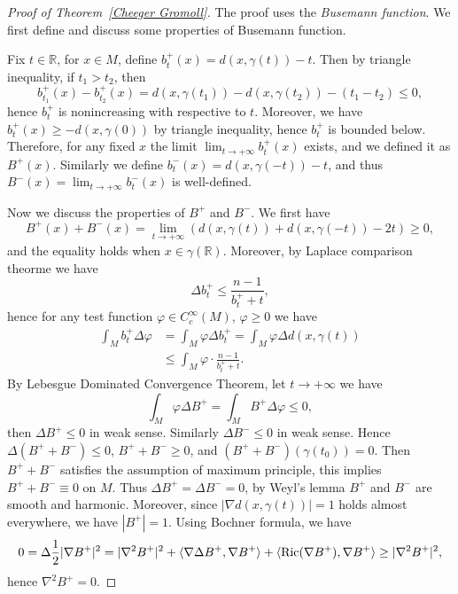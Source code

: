 \begin{proof}[Proof of Theorem~\ref{Cheeger Gromoll}]
    The proof uses the \emph{Busemann function}.
    We first define and discuss some properties of Busemann function.

    Fix $t\in\mathbb{R}$, for $x\in M$, define $b^+_t(x)=d(x,\gamma(t))-t$.
    Then by triangle inequality, if $t_1>t_2$, then
    \[b_{t_1}^+(x)-b_{t_2}^+(x)=d(x,\gamma(t_1))-d(x,\gamma(t_2))-(t_1-t_2)\leq 0,\]
    hence $b_t^+$ is nonincreasing with respective to $t$.
    Moreover, we have $b_t^+(x)\geq-d(x,\gamma(0))$ by triangle inequality, hence $b_t^+$ is bounded below.
    Therefore, for any fixed $x$ the limit $\lim_{t\to+\infty}b^+_t(x)$ exists, and we defined it as $B^+(x)$.
    Similarly we define $b^-_t(x)=d(x,\gamma(-t))-t$, and thus $B^-(x)=\lim_{t\to+\infty}b^-_t(x)$ is well-defined.

    Now we discuss the properties of $B^+$ and $B^-$.
    We first have
    \[B^+(x)+B^-(x)=\lim_{t\to+\infty}(d(x,\gamma(t))+d(x,\gamma(-t))-2t)\geq 0,\]
    and the equality holds when $x\in\gamma(\mathbb{R})$.
    Moreover, by Laplace comparison theorme we have
    \[\Delta b^+_t\leq\frac{n-1}{b^+_t+t},\]
    hence for any test function $\varphi\in C^\infty_c(M)$, $\varphi\geq 0$ we have
    \begin{align*}
        \int_Mb^+_t\Delta\varphi&=\int_M\varphi\Delta b^+_t=\int_M\varphi\Delta d(x,\gamma(t))\\
        &\leq\int_M\varphi\cdot\frac{n-1}{b^+_t+t}.
    \end{align*}
    By Lebesgue Dominated Convergence Theorem, let $t\to+\infty$ we have
    \[\int_M\varphi\Delta B^+=\int_M B^+\Delta\varphi\leq 0,\]
    then $\Delta B^+\leq 0$ in weak sense.
    Similarly $\Delta B^-\leq 0$ in weak sense.
    Hence $\Delta(B^++B^-)\leq 0$, $B^++B^-\geq 0$, and $(B^++B^-)(\gamma(t_0))=0$.
    Then $B^++B^-$ satisfies the assumption of maximum principle, this implies $B^++B^-\equiv 0$ on $M$.
    Thus $\Delta B^+=\Delta B^-=0$, by Weyl's lemma $B^+$ and $B^-$ are smooth and harmonic.
    Moreover, since $|\nabla d(x,\gamma(t))|=1$ holds almost everywhere, we have $|B^+|=1$.
    Using Bochner formula, we have
    \[0=\Delta\frac{1}{2}|\nabla B^+|^2=|\nabla^2B^+|^2+\langle\nabla\Delta B^+,\nabla B^+\rangle+\langle\operatorname{Ric}(\nabla B^+),\nabla B^+\rangle\geq|\nabla^2B^+|^2,\]
    hence $\nabla^2B^+=0$.


\end{proof}
